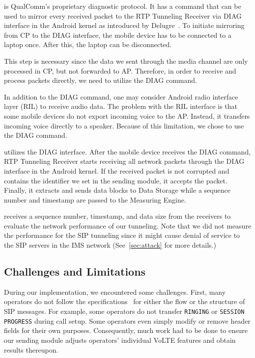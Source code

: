  is QualComm's proprietary diagnostic protocol.
It has a command that can be used to mirror every received packet to
the RTP Tunneling Receiver via DIAG interface in the Android kernel
as introduced by Delugre~\cite{delugre2011reverse}. To initiate
mirroring from CP to the DIAG interface, the mobile device has to be
connected to a laptop once. After this, the laptop can be
disconnected.

This step is necessary since the data we sent through the media
channel are only processed in CP, but not forwarded to AP. Therefore,
in order to receive and process packets directly, we need to utilize
the DIAG command.

In addition to the DIAG command, one may consider Android radio
interface layer (RIL) to receive audio data. The problem with the RIL
interface is that some mobile devices do not export incoming voice to
 the AP. Instead, it transfers incoming voice directly to a speaker. Because
of this limitation, we chose to use the DIAG command.

 utilizes the DIAG interface.  After
the mobile device receives the DIAG command, RTP Tunneling Receiver
starts receiving all network packets through the DIAG interface in the
Android kernel. If the received packet is not corrupted and contains
the identifier we set in the sending module, it accepts the
packet. Finally, it extracts and sends data blocks to Data Storage
while a sequence number and timestamp are passed to the Measuring Engine.

 receives a sequence number, timestamp, and data size
from the receivers to evaluate the network performance of our tunneling.
Note that we did not measure the performance for the SIP tunneling
since it might cause denial of service to the SIP servers in the IMS
network (See~\autoref{sec:attack} for more details.)


\subsection{Challenges and Limitations}
During our implementation, we encountered some challenges. First,
many operators do not follow the specifications~\cite{3gpp_ims,
  gsma_volte} for either the flow or the structure of SIP messages. For
example, some operators do not transfer {\tt RINGING} or {\tt SESSION
  PROGRESS} during call setup. Some operators even simply modify or remove header fields for their own purposes.
Consequently, much work had to be done to ensure our sending module adjusts operators' individual VoLTE features and obtain results thereupon.

